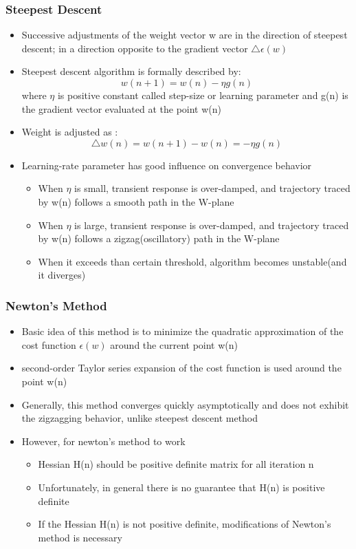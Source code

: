 \documentclass[12pt]{article}
\begin{document}
\subsubsection{Steepest Descent}
\begin{itemize}
	\item Successive adjustments of the weight vector w are in the direction of steepest descent; in a direction opposite to the gradient vector $\triangle \epsilon(w)$
	\item Steepest descent algorithm is formally described by: $$ w(n + 1) = w(n) - \eta g(n)$$ 
	where $ \eta$ is positive constant called step-size or learning parameter and g(n) is the gradient vector evaluated at the point w(n)
	\item Weight is adjusted as : $$ \triangle w(n) = w(n + 1) - w(n)  = - \eta g(n) $$ 
	\item Learning-rate parameter has good influence on convergence behavior
		\begin{itemize}
			\item When $\eta$ is small, transient response is over-damped, and trajectory traced by w(n) follows a smooth path in the W-plane
			\item When $\eta$ is large, transient response is over-damped, and trajectory traced by w(n) follows a zigzag(oscillatory) path in the W-plane
			\item When it exceeds than certain threshold, algorithm becomes unstable(and it diverges)
		\end{itemize}
\end{itemize}

\subsubsection{Newton's Method}

\begin{itemize}
	\item Basic idea of this method is to minimize the quadratic approximation of the cost function $\epsilon(w)$ around the current point w(n)
	\item second-order Taylor series expansion of the cost function is used around the point w(n)
	\item Generally, this method converges quickly asymptotically and does not exhibit the zigzagging behavior, unlike steepest descent method
	\item However, for newton's method to work 
		\begin{itemize}
			\item Hessian H(n) should be positive definite matrix for all iteration n
			\item Unfortunately, in general there is no guarantee that H(n) is positive definite
			\item If the Hessian H(n) is not positive definite, modifications of Newton's method is necessary
		\end{itemize}
\end{itemize}
\end{document}

